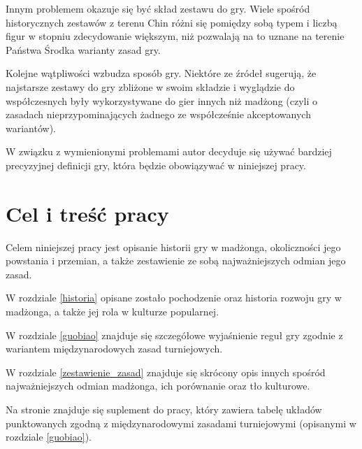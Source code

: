 Innym problemem okazuje się być skład zestawu do gry. Wiele spośród
historycznych zestawów z terenu Chin różni się pomiędzy sobą typem i liczbą
figur w stopniu zdecydowanie większym, niż pozwalają na to uznane na terenie
Państwa Środka warianty zasad gry.

Kolejne wątpliwości wzbudza sposób gry. Niektóre ze źródeł sugerują, że
najstarsze zestawy do gry zbliżone w swoim składzie i wyglądzie do współczesnych
były wykorzystywane do gier innych niż madżong (czyli o zasadach
nieprzypominających żadnego ze współcześnie akceptowanych wariantów).

W związku z wymienionymi problemami autor decyduje się używać bardziej
precyzyjnej definicji gry, %
która będzie obowiązywać w niniejszej pracy.



\section{Cel i treść pracy}
Celem niniejszej pracy jest opisanie historii gry w madżonga, okoliczności jego
powstania i przemian, a także zestawienie ze sobą najważniejszych odmian jego
zasad.

W rozdziale \ref{historia} opisane zostało pochodzenie oraz historia rozwoju gry
w madżonga, a także jej rola w kulturze popularnej.

W rozdziale \ref{guobiao} znajduje się szczegółowe wyjaśnienie reguł gry zgodnie
z wariantem międzynarodowych zasad turniejowych.

W rozdziale \ref{zestawienie_zasad} znajduje się skrócony opis innych spośród
najważniejszych odmian madżonga, ich porównanie oraz tło kulturowe.

Na stronie \pageref{suplement} znajduje się suplement do pracy, który zawiera
tabelę układów punktowanych zgodną z międzynarodowymi zasadami turniejowymi
(opisanymi w rozdziale \ref{guobiao}).

